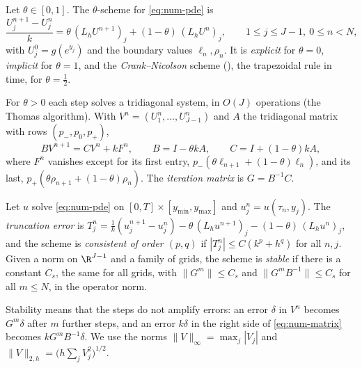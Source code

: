 \begin{definition}\label{def:num-theta}
Let $\theta\in[0,1]$. The $\theta$-scheme for \eqref{eq:num-pde} is
\begin{equation}\label{eq:num-theta}
  \frac{U^{n+1}_j-U^n_j}{k}=\theta\,(L_hU^{n+1})_j+(1-\theta)\,(L_hU^n)_j,\qquad1\le j\le J-1,\ 0\le n<N,
\end{equation}
with $U^0_j=g(e^{y_j})$ and the boundary values $\ell_n,\rho_n$. It is \emph{explicit} for
$\theta=0$, \emph{implicit} for $\theta=1$, and the \emph{Crank--Nicolson} scheme
(\textcite{crank-nicolson-1947}), the trapezoidal rule in time, for $\theta=\frac12$.
\end{definition}

For $\theta>0$ each step solves a tridiagonal system, in $O(J)$ operations (the Thomas
algorithm). With $V^n=(U^n_1,\dots,U^n_{J-1})$ and $A$ the tridiagonal matrix with rows $(p_-,p_0,p_+)$,
\begin{equation}\label{eq:num-matrix}
  BV^{n+1}=CV^n+kF^n,\qquad B=I-\theta kA,\qquad C=I+(1-\theta)kA,
\end{equation}
where $F^n$ vanishes except for its first entry, $p_-(\theta\ell_{n+1}+(1-\theta)\ell_n)$, and its
last, $p_+(\theta\rho_{n+1}+(1-\theta)\rho_n)$. The \emph{iteration matrix} is $G=B^{-1}C$.

\begin{definition}\label{def:num-stability}
Let $u$ solve \eqref{eq:num-pde} on $[0,T]\times[y_{\min},y_{\max}]$ and $u^n_j=u(\tau_n,y_j)$. The
\emph{truncation error} is
$T^n_j=\frac1k(u^{n+1}_j-u^n_j)-\theta\,(L_hu^{n+1})_j-(1-\theta)\,(L_hu^n)_j$, and the scheme is
\emph{consistent of order $(p,q)$} if $|T^n_j|\le C(k^p+h^q)$ for all $n,j$. Given a norm on $\R^{J-1}$
and a family of grids, the scheme is \emph{stable} if there is a constant $C_s$, the same for all
grids, with $\|G^m\|\le C_s$ and $\|G^mB^{-1}\|\le C_s$ for all $m\le N$, in the operator norm.
\end{definition}

Stability means that the steps do not amplify errors: an error $\delta$ in $V^n$ becomes $G^m\delta$
after $m$ further steps, and an error $k\delta$ in the right side of \eqref{eq:num-matrix} becomes
$kG^mB^{-1}\delta$. We use the norms $\|V\|_\infty=\max_j|V_j|$ and $\|V\|_{2,h}=\big(h\sum_jV_j^2\big)^{1/2}$.

